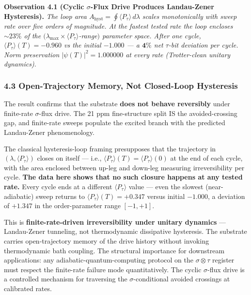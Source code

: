 \documentclass[
]{article}
\begin{document}
\textbf{Observation 4.1 (Cyclic \(\sigma\)-Flux Drive Produces
Landau-Zener Hysteresis).} \emph{The loop area
\(A_\text{hyst} = \oint \langle P_\tau \rangle\, d\lambda\) scales
monotonically with sweep rate over five orders of magnitude. At the
fastest tested rate the loop encloses \(\sim 23\%\) of the
\((\lambda_\text{max} \times \langle P_\tau\rangle\)-range\()\)
parameter space. After one cycle, \(\langle P_\tau \rangle(T) = -0.960\)
vs the initial \(-1.000\) --- a \(\mathbf{4\%}\) net \(\tau\)-bit
deviation per cycle. Norm preservation \(|\psi(T)|^2 = 1.000000\) at
every rate (Trotter-clean unitary dynamics).}

\subsubsection{4.3 Open-Trajectory Memory, Not Closed-Loop
Hysteresis}\label{open-trajectory-memory-not-closed-loop-hysteresis}

The result confirms that the substrate \textbf{does not behave
reversibly} under finite-rate \(\sigma\)-flux drive. The 21 ppm
fine-structure split IS the avoided-crossing gap, and finite-rate sweeps
populate the excited branch with the predicted Landau-Zener
phenomenology.

The classical hysteresis-loop framing presupposes that the trajectory in
\((\lambda, \langle P_\tau\rangle)\) closes on itself --- i.e.,
\(\langle P_\tau\rangle(T) = \langle P_\tau\rangle(0)\) at the end of
each cycle, with the area enclosed between up-leg and down-leg measuring
irreversibility per cycle. \textbf{The data here shows that no such
closure happens at any tested rate.} Every cycle ends at a different
\(\langle P_\tau\rangle\) value --- even the slowest (near-adiabatic)
sweep returns to \(\langle P_\tau\rangle(T) = +0.347\) versus initial
\(-1.000\), a deviation of \(+1.347\) in the order-parameter range
\([-1, +1]\).

This is \textbf{finite-rate-driven irreversibility under unitary
dynamics} --- Landau-Zener tunneling, not thermodynamic dissipative
hysteresis. The substrate carries open-trajectory memory of the drive
history without invoking thermodynamic bath coupling. The structural
importance for downstream applications: any adiabatic-quantum-computing
protocol on the \(\sigma\otimes\tau\) register must respect the
finite-rate failure mode quantitatively. The cyclic \(\sigma\)-flux
drive is a controlled mechanism for traversing the
\(\sigma\)-conditional avoided crossings at calibrated rates.
\end{document}
